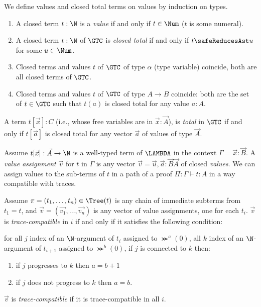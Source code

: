 \begin{definition}
  We define values and closed total terms on values by induction on types. 
  \begin{enumerate}
  \item
    A closed term $t:\N$ is a \emph{value} if and only if $t \in \Num$ ($t$ is some numeral).
  \item
    A closed term $t:\N$ of $\GTC$ is \emph{closed total}
    if and only if $t \safeReducesAst u$ for some $u\in \Num$.
  \item
    Closed terms and values $t$ of $\GTC$ of type $\alpha$ (type variable) coincide, 
    both are all closed terms of $\GTC$.
   \item
    Closed terms and values $t$ of $\GTC$ of type $A\rightarrow B$ coincide:
    both are the set of $t \in \GTC$ such that $t(a)$ is closed total for any value $a:A$.
   \end{enumerate}
   A term $t[\vec{x}]:C$ (i.e., whose free variables are in $\vec{x}:\vec{A}$), is \emph{total} in $\GTC$
   if and only if $t[\vec{a}]$ is closed total for any vector $\vec{a}$ of values of type $\vec{A}$.
\end{definition}

Assume $t[\vec{x}]:\vec{A}\rightarrow\N$ is a well-typed term of $\LAMBDA$ in the context 
 $\Gamma = \vec{x}:\vec{B}$.
 A \emph{value assignment} $\vec{v}$ for $t$ in $\Gamma$ is any vector 
$\vec{v}=\vec{u},\vec{a}:\vec{B}\vec{A}$ of closed \emph{values}. 
We can assign values to  the sub-terms of $t$
in a path of a proof $\Pi : \Gamma \vdash t: A$ in a way compatible with traces. 

\begin{definition}
Assume $\pi = (t_1, \ldots, t_n) \in \Tree(t)$ is any chain of immediate subterms from $t_1=t$,
and $\vec{v} = (\vec{v_1}, \ldots, \vec{v_n})$ 
 is any vector of value assignments, one for each $t_i$. 
$\vec{v}$ is \emph{trace-compatible} in $i$  if and only if it satisfies the following condition:

  for all $j$  index of an $\N$-argument of $t_i$ assigned to $\Succ^{a}(0)$, 
  all $k$ index of an $\N$-argument of $t_{i+1}$ assigned to $\Succ^{b}(0)$, 
  if $j$ is connected to $k$ then:
 \begin{enumerate}
 \item
 if $j$ progresses to $k$ then $a=b+1$
 \item
 if $j$ does not progress to $k$ then $a=b$.
 \end{enumerate}
$\vec{v}$ is \emph{trace-compatible} if it is trace-compatible in all $i$.
\end{definition}

